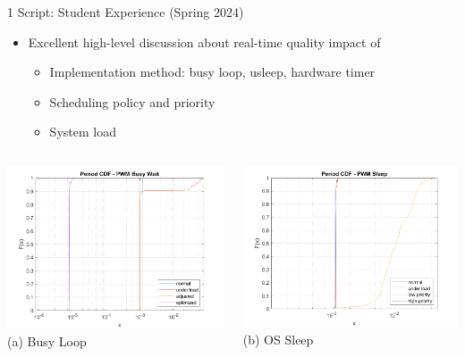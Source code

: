 \documentclass[xcolor=dvipsnames, aspectratio=169]{beamer}
\begin{document}
\begin{frame}{1 Script: Student Experience (Spring 2024)} 
    \begin{infobox}
    \begin{itemize}
        \item Excellent high-level discussion about real-time quality impact of
        \begin{itemize}
            \item Implementation method: busy loop, usleep, hardware timer
            \item Scheduling policy and priority 
            \item System load 
        \end{itemize}
    \end{itemize}
    \end{infobox}
    \begin{columns}
        \includegraphics[width=\textwidth]{../1-script/period_busy.png}
        \tiny\centering (a) Busy Loop
        
        \includegraphics[width=\textwidth]{../1-script/period_sleep.png}
        \tiny\centering (b) OS Sleep
        

\end{columns}
\end{frame}
\end{document}
